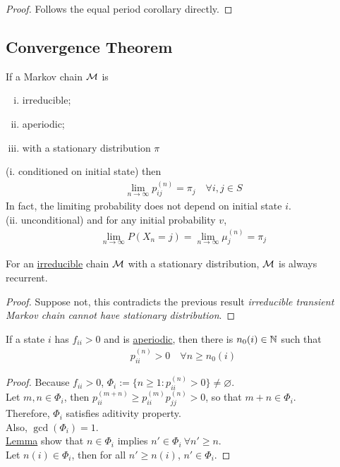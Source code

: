 \documentclass{article}
\newcommand{\upn}[0]{^{(n)}}
\begin{document}
	\begin{proof}
		Follows the equal period corollary directly.
	\end{proof}
	
	\subsection{Convergence Theorem}
	
	\begin{theorem}
		If a Markov chain $\mathcal{{M}}$ is 
		\begin{enumerate}[(i)]
			\item irreducible;
			\item aperiodic;
			\item with a stationary distribution $\pi$
		\end{enumerate}
		(i. conditioned on initial state) then
		\begin{align}
			\lim_{n \to \infty} p_{ij}\upn = \pi_j\quad\forall i, j \in S
		\end{align}
		In fact, the limiting probability does not depend on initial state $i$. \\
		(ii. unconditional) and for any initial probability $v$,
		\begin{align}
			\lim_{n \to \infty} P(X_n = j) 
			= \lim_{n \to \infty} \mu_j\upn
			= \pi_j
		\end{align}
	\end{theorem}
	
	\begin{theorem}
		For an \ul{irreducible} chain $\mathcal{{M}}$ with a stationary distribution, $\mathcal{{M}}$ is always recurrent.
	\end{theorem}
	
	\begin{proof}
		Suppose not, this contradicts the previous result \emph{irreducible transient Markov chain cannot have stationary distribution}.
	\end{proof}
	
	\begin{proposition}
		If a state $i$ has $f_{ii} > 0$ and is \ul{aperiodic}, then there is $n_0(i) \in \mathbb{N}$ such that
		\begin{align}
			p_{ii}\upn > 0\quad \forall n \geq n_0(i)
		\end{align}
	\end{proposition}
	
	\begin{proof}
		Because $f_{ii} > 0$, $\Phi_i := \{n \geq 1: p_{ii}\upn > 0\} \neq \varnothing$. \\
		Let $m, n \in \Phi_i$, then $p_{ii}^{(m+n)} \geq p_{ii}^{(m)} p_{jj}^{(n)} > 0$, so that $m + n \in \Phi_i$. \\
		Therefore, $\Phi_i$ satisfies aditivity property. \\
		Also, $\gcd(\Phi_i) = 1$. \\
		\ul{Lemma} show that $n \in \Phi_i$ implies $n' \in \Phi_i\ \forall n' \geq n$. \\
		Let $n(i) \in \Phi_i$, then for all $n' \geq n(i)$, $n' \in \Phi_i$.
	\end{proof}
\end{document}
